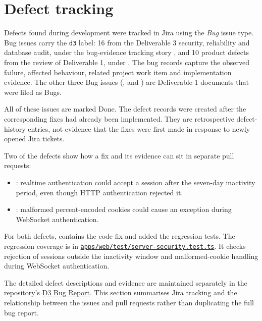 \section{Defect tracking}\label{sec:defects}

Defects found during development were tracked in Jira using the \emph{Bug}
issue type. \JiraDefectBugs{} Bug issues carry the \texttt{d3} label: 16 from
the Deliverable 3 security, reliability and database audit, under the
bug-evidence tracking story , and 10 product defects from the
review of Deliverable 1, under . The bug records capture the
observed failure, affected behaviour, related project work item and
implementation evidence. The other three Bug issues (,
 and ) are Deliverable 1 documents that were filed
as Bugs.

All of these issues are marked Done. The \JiraDefectBugs{} defect records were
created after the corresponding fixes had already been implemented. They are
retrospective defect-history entries, not evidence that the fixes were first
made in response to newly opened Jira tickets.

Two of the defects show how a fix and its evidence can sit in separate pull
requests:
\begin{itemize}
  \item {}: realtime authentication could accept a session
  after the seven-day inactivity period, even though HTTP authentication
  rejected it.
  \item {}: malformed percent-encoded cookies could cause an
  exception during WebSocket authentication.
\end{itemize}

For both defects,  contains the code fix and  added the
regression tests. The regression coverage is in
\href{\repourl/blob/master/apps/web/test/server-security.test.ts}
{\nolinkurl{apps/web/test/server-security.test.ts}}. It checks rejection of
sessions outside the inactivity window and malformed-cookie handling during
WebSocket authentication.

The detailed defect descriptions and evidence are maintained separately in
the repository's
\href{\repourl/tree/master/Deliverables/D3/Bug_Report}
{D3 Bug Report}. This section summarises Jira tracking and the relationship
between the issues and pull requests rather than duplicating the full bug
report.
